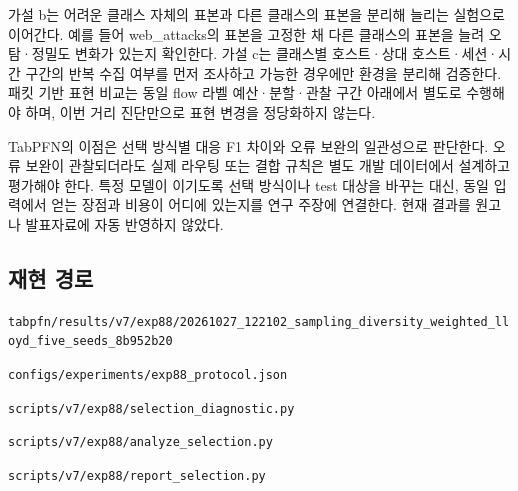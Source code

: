 가설 b는 어려운 클래스 자체의 표본과 다른 클래스의 표본을 분리해 늘리는 실험으로 이어간다. 예를 들어 web\_\allowbreak{}attacks의 표본을 고정한 채 다른 클래스의 표본을 늘려 오탐·정밀도 변화가 있는지 확인한다. 가설 c는 클래스별 호스트·상대 호스트·세션·시간 구간의 반복 수집 여부를 먼저 조사하고 가능한 경우에만 환경을 분리해 검증한다. 패킷 기반 표현 비교는 동일 flow 라벨 예산·분할·관찰 구간 아래에서 별도로 수행해야 하며, 이번 거리 진단만으로 표현 변경을 정당화하지 않는다.

TabPFN의 이점은 선택 방식별 대응 F1 차이와 오류 보완의 일관성으로 판단한다. 오류 보완이 관찰되더라도 실제 라우팅 또는 결합 규칙은 별도 개발 데이터에서 설계하고 평가해야 한다. 특정 모델이 이기도록 선택 방식이나 test 대상을 바꾸는 대신, 동일 입력에서 얻는 장점과 비용이 어디에 있는지를 연구 주장에 연결한다. 현재 결과를 원고나 발표자료에 자동 반영하지 않았다.

\subsection{재현 경로}
\texttt{tabpfn/\allowbreak{}\allowbreak{}r\allowbreak{}esults/\allowbreak{}\allowbreak{}v\allowbreak{}7/\allowbreak{}\allowbreak{}exp88/\allowbreak{}\allowbreak{}20261027\allowbreak{}\_\allowbreak{}\allowbreak{}122102\_\allowbreak{}\allowbreak{}sampling\allowbreak{}\_\allowbreak{}\allowbreak{}diversi\allowbreak{}ty\_\allowbreak{}\allowbreak{}weigh\allowbreak{}ted\_\allowbreak{}\allowbreak{}lloy\allowbreak{}d\_\allowbreak{}\allowbreak{}five\_\allowbreak{}\allowbreak{}s\allowbreak{}eeds\_\allowbreak{}\allowbreak{}8b9\allowbreak{}52b20}

\texttt{configs/\allowbreak{}\allowbreak{}experime\allowbreak{}nts/\allowbreak{}\allowbreak{}exp8\allowbreak{}8\_\allowbreak{}\allowbreak{}protoc\allowbreak{}ol.\allowbreak{}json}

\texttt{scripts/\allowbreak{}\allowbreak{}v7/\allowbreak{}\allowbreak{}exp88\allowbreak{}/\allowbreak{}\allowbreak{}selecti\allowbreak{}on\_\allowbreak{}\allowbreak{}diagn\allowbreak{}ostic.\allowbreak{}py\allowbreak{}}

\texttt{scripts/\allowbreak{}\allowbreak{}v7/\allowbreak{}\allowbreak{}exp88\allowbreak{}/\allowbreak{}\allowbreak{}analyze\allowbreak{}\_\allowbreak{}\allowbreak{}selecti\allowbreak{}on.\allowbreak{}py}

\texttt{scripts/\allowbreak{}\allowbreak{}v7/\allowbreak{}\allowbreak{}exp88\allowbreak{}/\allowbreak{}\allowbreak{}report\_\allowbreak{}\allowbreak{}selectio\allowbreak{}n.\allowbreak{}py}


